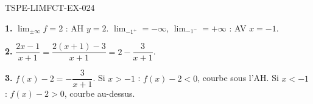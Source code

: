 \begin{corrige}{TSPE-LIMFCT-EX-024}

\textbf{1.} $\lim_{\pm\infty} f = 2$ : AH $y = 2$. $\lim_{-1^+} = -\infty$, $\lim_{-1^-} = +\infty$ : AV $x = -1$.

\textbf{2.} $\dfrac{2x-1}{x+1} = \dfrac{2(x+1)-3}{x+1} = 2 - \dfrac{3}{x+1}$.

\textbf{3.} $f(x)-2 = -\dfrac{3}{x+1}$. Si $x > -1$ : $f(x)-2 < 0$, courbe sous l'AH. Si $x < -1$ : $f(x)-2 > 0$, courbe au-dessus.

\end{corrige}

